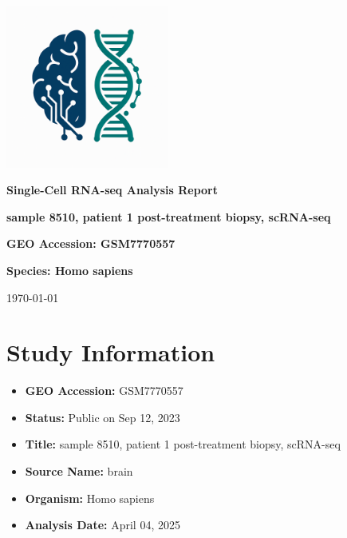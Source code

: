 \documentclass[12pt]{article}
\begin{document}
\begin{titlepage}
    \centering
    \vspace*{2cm}

    \includegraphics[width=0.4\textwidth]{scagentic_logo.png}
    \vspace{1cm}

    \Huge\textbf{Single-Cell RNA-seq Analysis Report}
    \vspace{1cm}

    \Large\textbf{sample 8510, patient 1 post-treatment biopsy, scRNA-seq}
    \vspace{0.5cm}

    \Large\textbf{GEO Accession: GSM7770557}
    \vspace{0.5cm}

    \Large\textbf{Species: Homo sapiens}
    \vspace{0.5cm}
    \vspace{1cm}

    \large\today
\end{titlepage}

\tableofcontents
\newpage

\section{Study Information}
\begin{itemize}
    \item \textbf{GEO Accession:} GSM7770557
    \item \textbf{Status:} Public on Sep 12, 2023
    \item \textbf{Title:} sample 8510, patient 1 post-treatment biopsy, scRNA-seq
    \item \textbf{Source Name:} brain
    \item \textbf{Organism:} Homo sapiens
    \item \textbf{Analysis Date:} {April 04, 2025}
\end{itemize}
\end{document}
